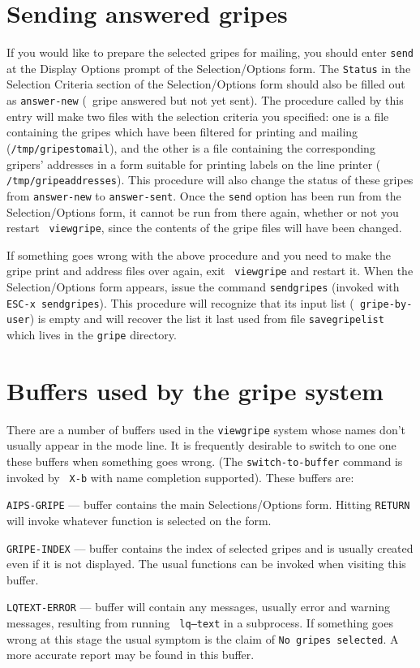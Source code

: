 \section{Sending answered gripes}

If you would like to prepare the selected gripes for mailing, you
should enter {\tt send} at the Display Options prompt of the
Selection/Options form.  The {\tt Status} in the Selection Criteria
section of the Selection/Options form should also be filled out as
{\tt answer-new} (\ie\ gripe answered but not yet sent).  The
procedure called by this entry will make two files with the selection
criteria you specified: one is a file containing the gripes which have
been filtered for printing and mailing ({\tt /tmp/gripestomail}), and
the other is a file containing the corresponding gripers' addresses in
a form suitable for printing labels on the line printer ({\tt
/tmp/gripeaddresses}). This procedure will also change the status of
these gripes from {\tt answer-new} to {\tt answer-sent}.  Once the
{\tt send} option has been run from the Selection/Options form, it
cannot be run from there again, whether or not you restart {\tt
viewgripe}, since the contents of the gripe files will have been
changed.

If something goes wrong with the above procedure and you need to
make the gripe print and address files over again, exit {\tt
viewgripe} and restart it.  When the Selection/Options form appears,
issue the command {\tt sendgripes} (invoked with {\tt ESC-x
sendgripes}).  This procedure will recognize that its input list ({\tt
gripe-by-user}) is empty and will recover the list it last used from
file {\tt savegripelist} which lives in the {\tt gripe} directory.

\section{Buffers used by the gripe system}

There are a number of buffers used in the {\tt viewgripe} system whose
names don't usually appear in the mode line.  It is frequently
desirable to switch to one one these buffers when something goes
wrong.  (The {\tt switch-to-buffer} command is invoked by {\tt \^{
}X-b} with name completion supported).  These buffers are:
\begin{description}
\item{{\tt AIPS-GRIPE}} --- buffer contains the main
    Selections/Options form.  Hitting {\tt RETURN} will invoke
    whatever function is selected on the form.
\item{{\tt GRIPE-INDEX}} --- buffer contains the index of selected
    gripes and is usually created even if it is not displayed.  The
    usual functions can be invoked when visiting this buffer.
\item{{\tt LQTEXT-ERROR}} --- buffer will contain any messages,
    usually error and warning messages, resulting from running {\tt
    lq--text} in a subprocess.  If something goes wrong at this stage
    the usual symptom is the claim of {\tt No gripes selected}.  A
    more accurate report may be found in this buffer.
\end{description}

